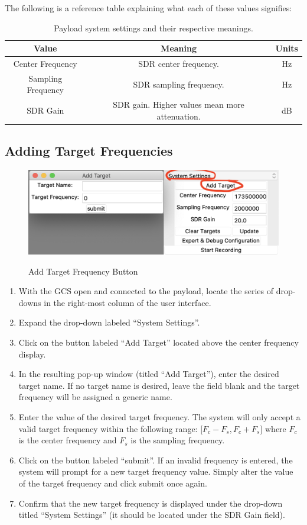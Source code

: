 \documentclass{report}
\begin{document}
			The following is a reference table explaining what each of these values signifies:
			\begin{table}[htb]
			\centering
			\caption{Payload system settings and their respective meanings.}
			\begin{tabular}{||c c c||}
			\hline
			Value & Meaning & Units\\ [0.5ex]
			\hline\hline
			Center Frequency & SDR center frequency. & Hz \\
			\hline
			Sampling Frequency & SDR sampling frequency. & Hz \\
			\hline
			SDR Gain & SDR gain. Higher values mean more attenuation. & dB \\ [1ex]
			\hline
			\end{tabular}
			\end{table}
		\subsection{Adding Target Frequencies}
			\begin{figure}[htb]
				\centering
				\caption{Add Target Frequency Button}
				\includegraphics[scale=0.5]{add_target_btn.jpg}
				\label{fig:add_target_btn}
			\end{figure}
			\begin{enumerate}
				\item With the GCS open and connected to the payload, locate the series of drop-downs in the right-most column of the user interface.
				\item Expand the drop-down labeled ``System Settings''.
				\item Click on the button labeled ``Add Target'' located above the center frequency display.
				\item In the resulting pop-up window (titled ``Add Target''), enter the desired target name. If no target name is desired, leave the field blank and the target frequency will be assigned a generic name.
				\item Enter the value of the desired target frequency. The system will only accept a valid target frequency within the following range: [$F_c - F_s , F_c + F_s$] where $F_c$ is the center frequency and $F_s$ is the sampling frequency. 
				\item Click on the button labeled ``submit''. If an invalid frequency is entered, the system will prompt for a new target frequency value. Simply alter the value of the target frequency and click submit once again.
				\item Confirm that the new target frequency is displayed under the drop-down titled ``System Settings'' (it should be located under the SDR Gain field).
			\end{enumerate}
\end{document}
